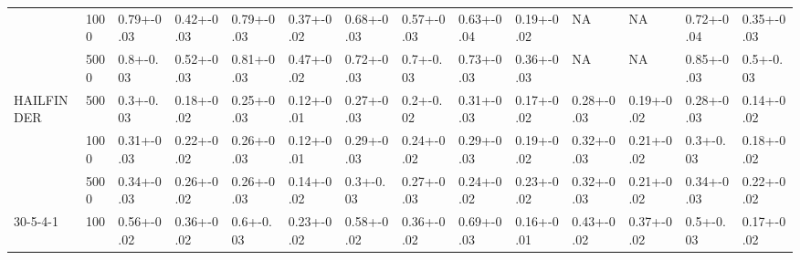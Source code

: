 \documentclass{svmult}
\begin{document}
\begin{landscape}
\begin{center}
{\begin{tabular}{llllllllllllll}
           & 1000    & 0.79+-0.03                    & 0.42+-0.03                 & 0.79+-0.03                    & 0.37+-0.02                 & 0.68+-0.03                    & 0.57+-0.03                 & 0.63+-0.04                            & 0.19+-0.02                         & NA                            & NA                         & 0.72+-0.04                    & 0.35+-0.03                 \\
           & 5000    & 0.8+-0.03                     & 0.52+-0.03                 & 0.81+-0.03                    & 0.47+-0.02                 & 0.72+-0.03                    & 0.7+-0.03                  & 0.73+-0.03                            & 0.36+-0.03                         & NA                            & NA                         & 0.85+-0.03                    & 0.5+-0.03                  \\ \hline
HAILFINDER & 500     & 0.3+-0.03                     & 0.18+-0.02                 & 0.25+-0.03                    & 0.12+-0.01                 & 0.27+-0.03                    & 0.2+-0.02                  & 0.31+-0.03                            & 0.17+-0.02                         & 0.28+-0.03                            & 0.19+-0.02                         & 0.28+-0.03                    & 0.14+-0.02                 \\
           & 1000    & 0.31+-0.03                    & 0.22+-0.02                 & 0.26+-0.03                    & 0.12+-0.01                 & 0.29+-0.03                    & 0.24+-0.02                 & 0.29+-0.03                            & 0.19+-0.02                         & 0.32+-0.03                            & 0.21+-0.02                         & 0.3+-0.03                     & 0.18+-0.02                 \\
           & 5000    & 0.34+-0.03                    & 0.26+-0.02                 & 0.26+-0.03                    & 0.14+-0.02                 & 0.3+-0.03                     & 0.27+-0.03                 & 0.24+-0.02                            & 0.23+-0.02                         & 0.32+-0.03                            & 0.21+-0.02                         & 0.34+-0.03                    & 0.22+-0.02                 \\ \hline
30-5-4-1   & 100     & 0.56+-0.02                    & 0.36+-0.02                 & 0.6+-0.03                     & 0.23+-0.02                 & 0.58+-0.02                    & 0.36+-0.02                 & 0.69+-0.03                    & 0.16+-0.01                 & 0.43+-0.02                    & 0.37+-0.02                 & 0.5+-0.03                     & 0.17+-0.02                 \\

\end{tabular}}
\end{center}
\end{landscape}
\end{document}
